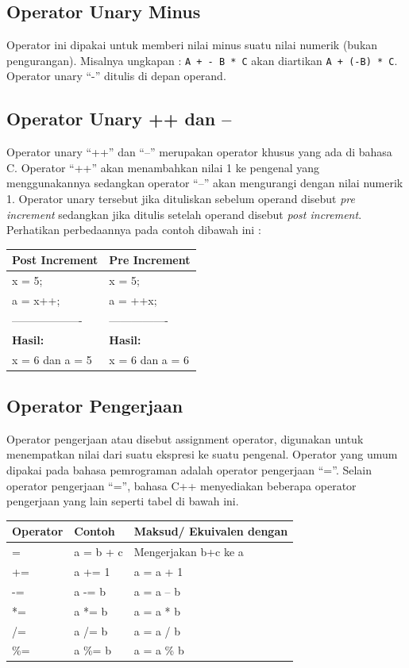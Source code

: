\subsection{Operator Unary Minus}\label{b-operator-unary-minus}

Operator ini dipakai untuk memberi nilai minus suatu nilai numerik
(bukan pengurangan). Misalnya ungkapan : \texttt{A\ +\ -\ B\ *\ C} akan
diartikan \texttt{A\ +\ (-B)\ *\ C}. Operator unary ``-'' ditulis di
depan operand.

\subsection{Operator Unary ++ dan --}\label{c-operator-unary-dan}

Operator unary ``++'' dan ``--'' merupakan operator khusus yang ada di
bahasa C. Operator ``++'' akan menambahkan nilai 1 ke pengenal yang
menggunakannya sedangkan operator ``--'' akan mengurangi dengan nilai
numerik 1. Operator unary tersebut jika dituliskan sebelum operand
disebut \emph{pre increment} sedangkan jika ditulis setelah operand
disebut \emph{post increment}. Perhatikan perbedaannya pada contoh
dibawah ini :

\begin{longtable}[]{@{}ll@{}}
\toprule
Post Increment & Pre Increment\tabularnewline
\midrule
\endhead
x = 5; & x = 5;\tabularnewline
a = x++; & a = ++x;\tabularnewline
------------------- & ----------------\tabularnewline
\textbf{Hasil:} & \textbf{Hasil:}\tabularnewline
x = 6 dan a = 5 & x = 6 dan a = 6\tabularnewline
\bottomrule
\end{longtable}

\subsection{Operator Pengerjaan}\label{d-operator-pengerjaan}

Operator pengerjaan atau disebut assignment operator, digunakan untuk
menempatkan nilai dari suatu ekspresi ke suatu pengenal. Operator yang
umum dipakai pada bahasa pemrograman adalah operator pengerjaan ``=''.
Selain operator pengerjaan ``='', bahasa C++ menyediakan beberapa
operator pengerjaan yang lain seperti tabel di bawah ini.

\begin{longtable}[]{@{}lll@{}}
\toprule
Operator & Contoh & Maksud/ Ekuivalen dengan\tabularnewline
\midrule
\endhead
= & a = b + c & Mengerjakan b+c ke a\tabularnewline
+= & a += 1 & a = a + 1\tabularnewline
-= & a -= b & a = a -- b\tabularnewline
*= & a *= b & a = a * b\tabularnewline
/= & a /= b & a = a / b\tabularnewline
\%= & a \%= b & a = a \% b\tabularnewline
\bottomrule
\end{longtable}

